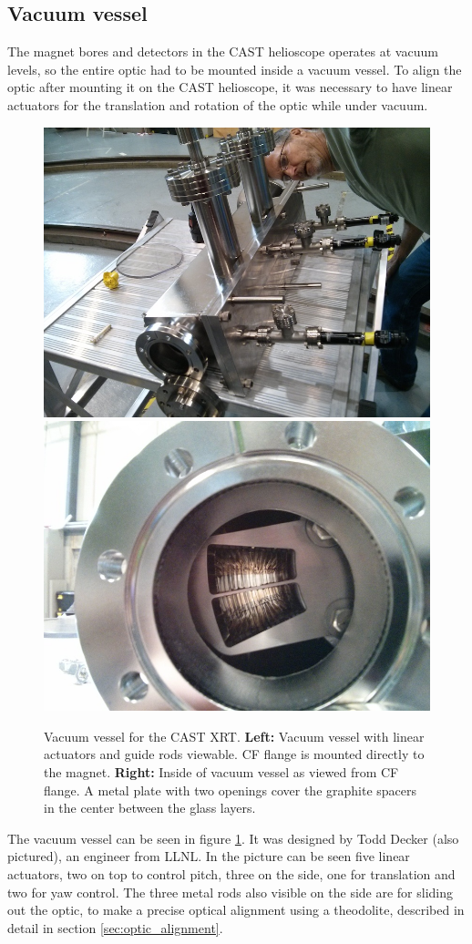 \subsection{Vacuum vessel}
The magnet bores and detectors in the CAST helioscope operates at vacuum levels, so the entire optic had to be mounted inside a vacuum vessel. To align the optic after mounting it on the CAST helioscope, it was necessary to have linear actuators for the translation and rotation of the optic while under vacuum.

\begin{figure}[htbp]
  \centering
    \includegraphics[width=0.45\linewidth]{figures/cast/cast_vessel1.jpg}
    \includegraphics[width=0.45\linewidth]{figures/cast/cast_vessel2.jpg}
  \caption{\footnotesize Vacuum vessel for the CAST XRT. \textbf{Left:} Vacuum vessel with linear actuators and guide rods viewable. CF flange is mounted directly to the magnet. \textbf{Right:} Inside of vacuum vessel as viewed from CF flange. A metal plate with two openings cover the graphite spacers in the center between the glass layers. }
  \label{fig:cast_vessel}
\end{figure}

The vacuum vessel can be seen in figure \ref{fig:cast_vessel}. It was designed by Todd Decker (also pictured), an engineer from LLNL. In the picture can be seen five linear actuators, two on top to control pitch, three on the side, one for translation and two for yaw control. The three metal rods also visible on the side are for sliding out the optic, to make a precise optical alignment using a theodolite, described in detail in section \ref{sec:optic_alignment}.

